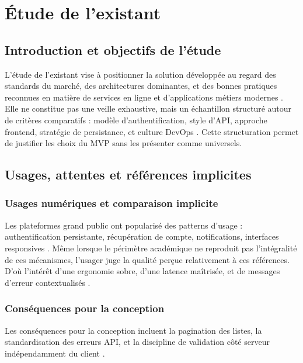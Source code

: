 \chapter{Étude de l'existant}
\label{chap:existant}

\section{Introduction et objectifs de l'étude}

L'étude de l'existant vise à positionner la solution développée au regard des standards du marché, des architectures dominantes, et des bonnes pratiques reconnues en matière de services en ligne et d'applications métiers modernes \cite{fielding2000,bass2021}. Elle ne constitue pas une veille exhaustive, mais un échantillon structuré autour de critères comparatifs : modèle d'authentification, style d'API, approche frontend, stratégie de persistance, et culture DevOps \cite{kleppmann2017,newman2021}. Cette structuration permet de justifier les choix du MVP sans les présenter comme universels.

\section{Usages, attentes et références implicites}

\subsection{Usages numériques et comparaison implicite}

Les plateformes grand public ont popularisé des patterns d'usage : authentification persistante, récupération de compte, notifications, interfaces responsives \cite{pressman2014}. Même lorsque le périmètre académique ne reproduit pas l'intégralité de ces mécanismes, l'usager juge la qualité perçue relativement à ces références. D'où l'intérêt d'une ergonomie sobre, d'une latence maîtrisée, et de messages d'erreur contextualisés \cite{iso25010}.

\subsection{Conséquences pour la conception}

Les conséquences pour la conception incluent la pagination des listes, la standardisation des erreurs API, et la discipline de validation côté serveur indépendamment du client \cite{rfc7231,owasp2021}.

